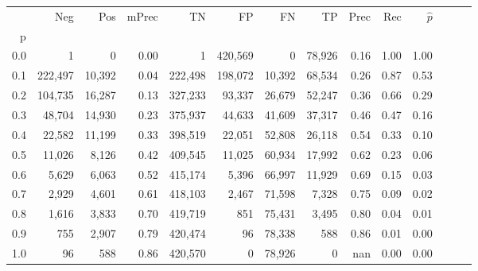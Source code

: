 \begin{tabular}{rrrrrrrrrrrrrr}
\toprule
{} &      Neg &     Pos & mPrec &       TN &       FP &      FN &      TP &  Prec &   Rec & $\hat{p}$ \\
p   &          &         &       &          &          &         &         &       &       &           \\
\midrule
0.0 &        1 &       0 &  0.00 &        1 &  420,569 &       0 &  78,926 &  0.16 &  1.00 &      1.00 \\
0.1 &  222,497 &  10,392 &  0.04 &  222,498 &  198,072 &  10,392 &  68,534 &  0.26 &  0.87 &      0.53 \\
0.2 &  104,735 &  16,287 &  0.13 &  327,233 &   93,337 &  26,679 &  52,247 &  0.36 &  0.66 &      0.29 \\
0.3 &   48,704 &  14,930 &  0.23 &  375,937 &   44,633 &  41,609 &  37,317 &  0.46 &  0.47 &      0.16 \\
0.4 &   22,582 &  11,199 &  0.33 &  398,519 &   22,051 &  52,808 &  26,118 &  0.54 &  0.33 &      0.10 \\
0.5 &   11,026 &   8,126 &  0.42 &  409,545 &   11,025 &  60,934 &  17,992 &  0.62 &  0.23 &      0.06 \\
0.6 &    5,629 &   6,063 &  0.52 &  415,174 &    5,396 &  66,997 &  11,929 &  0.69 &  0.15 &      0.03 \\
0.7 &    2,929 &   4,601 &  0.61 &  418,103 &    2,467 &  71,598 &   7,328 &  0.75 &  0.09 &      0.02 \\
0.8 &    1,616 &   3,833 &  0.70 &  419,719 &      851 &  75,431 &   3,495 &  0.80 &  0.04 &      0.01 \\
0.9 &      755 &   2,907 &  0.79 &  420,474 &       96 &  78,338 &     588 &  0.86 &  0.01 &      0.00 \\
1.0 &       96 &     588 &  0.86 &  420,570 &        0 &  78,926 &       0 &   nan &  0.00 &      0.00 \\
\bottomrule
\end{tabular}
